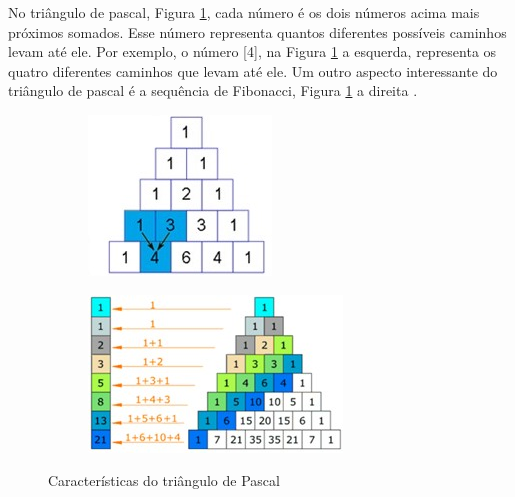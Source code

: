 No triângulo de pascal, Figura \ref{fig:pascal_triangle}, cada número é os dois números acima mais próximos somados. Esse número representa quantos diferentes possíveis caminhos levam até ele. Por exemplo, o número [4], na Figura \ref{fig:pascal_triangle} a esquerda, representa os quatro diferentes caminhos que levam até ele. Um outro aspecto interessante do triângulo de pascal é a sequência de Fibonacci, Figura \ref{fig:pascal_triangle} a direita \cite{mathisfun_pascal_triangle}.  

\begin{figure}[H]
\centering
	\begin{subfigure}[H]{0.47\linewidth}
	\includegraphics[width=.65\linewidth]{sections/images/pascal_triangle.jpg}
	\end{subfigure}
\hfill
	\begin{subfigure}[H]{0.47\linewidth}
	\includegraphics[width=.9\linewidth]{sections/images/pascal_triangle_fibonacci.jpg}
	\end{subfigure}%
\caption{Características do triângulo de Pascal}
\label{fig:pascal_triangle}
\end{figure}
